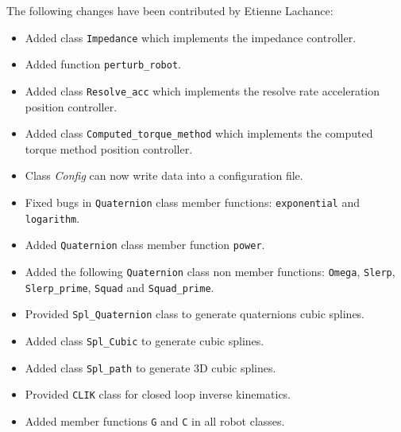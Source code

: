 \documentclass[dvips,11pt,fleqn]{report}
\begin{document}
\begin{description}
  The following changes have been contributed by Etienne Lachance:
  \begin{itemize}
  \item Added class \texttt{Impedance} which implements the impedance
    controller.
  \item Added function \texttt{perturb\_robot}.
  \item Added class \texttt{Resolve\_acc} which implements the resolve
    rate acceleration position controller.
  \item Added class \texttt{Computed\_torque\_method} which implements
    the computed torque method position controller.
  \item Class \emph{Config} can now write data into a configuration
    file.
  \item Fixed bugs in \texttt{Quaternion} class member functions:
    \texttt{exponential} and \texttt{logarithm}.
  \item Added \texttt{Quaternion} class member function
    \texttt{power}.
  \item Added the following \texttt{Quaternion} class non member
    functions: \texttt{Omega}, \texttt{Slerp}, \texttt{Slerp\_prime},
    \texttt{Squad} and \texttt{Squad\_prime}.
  \item Provided \texttt{Spl\_Quaternion} class to generate
    quaternions cubic splines.
  \item Added class \texttt{Spl\_Cubic} to generate cubic splines.
  \item Added class \texttt{Spl\_path} to generate 3D cubic splines.
  \item Provided \texttt{CLIK} class for closed loop inverse
    kinematics.
  \item Added member functions \texttt{G} and \texttt{C} in all robot
    classes.
  \end{itemize}


\end{description}
\end{document}
